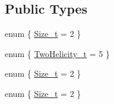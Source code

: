 \subsection*{Public Types}
\begin{DoxyCompactItemize}
\item 
enum \{ \mbox{\hyperlink{structHadron_1_1H5o2D2ERep_ab1ca7cf0f94144368f88aae0ee2298b1ae58e7162b9c8d4b9d3bfa548f2717c53}{Size\+\_\+t}} = 2
 \}
\item 
enum \{ \mbox{\hyperlink{structHadron_1_1H5o2D2ERep_af71aecfa36965082ebc872bc11741e1ea520d36da338c586c5e18c4904941251a}{Two\+Helicity\+\_\+t}} = 5
 \}
\item 
enum \{ \mbox{\hyperlink{structHadron_1_1H5o2D2ERep_ab1ca7cf0f94144368f88aae0ee2298b1ae58e7162b9c8d4b9d3bfa548f2717c53}{Size\+\_\+t}} = 2
 \}
\item 
enum \{ \mbox{\hyperlink{structHadron_1_1H5o2D2ERep_ab1ca7cf0f94144368f88aae0ee2298b1ae58e7162b9c8d4b9d3bfa548f2717c53}{Size\+\_\+t}} = 2
 \}
\end{DoxyCompactItemize}
